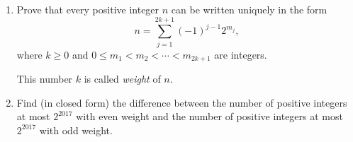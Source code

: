 \begin{enumerate}[label=(\alph*)]
	\item Prove that every positive integer $n$ can be written uniquely in the form \[n=\sum_{j=1}^{2k+1}(-1)^{j-1}2^{m_j},\] where $k\geq 0$ and $0\le m_1<m_2<\cdots <m_{2k+1}$ are integers.
	
	This number $k$ is called \emph{weight} of $n$.
	
	\item Find (in closed form) the difference between the number of positive integers at most $2^{2017}$ with even weight and the number of positive integers at most $2^{2017}$ with odd weight.
\end{enumerate}
